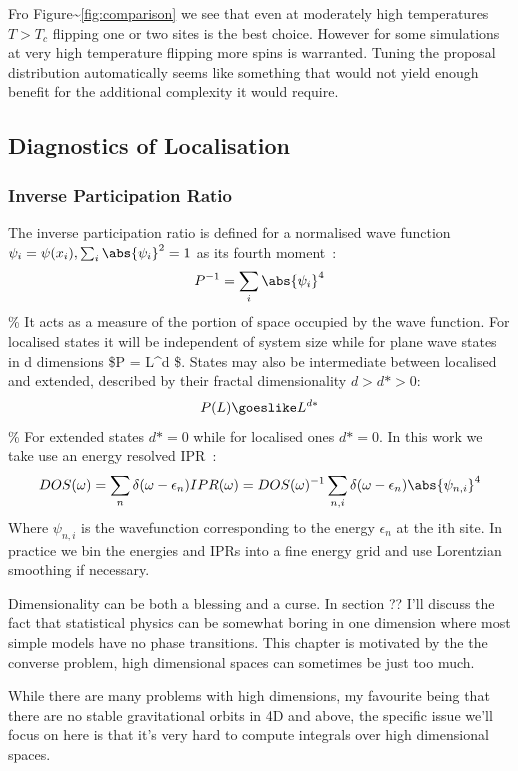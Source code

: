 Fro Figure\textasciitilde{}\ref{fig:comparison} we see that even at moderately high temperatures \(T > T_c\) flipping one or two sites is the best choice. However for some simulations at very high temperature flipping more spins is warranted. Tuning the proposal distribution automatically seems like something that would not yield enough benefit for the additional complexity it would require.

\hypertarget{diagnostics-of-localisation}{%
\subsection{Diagnostics of Localisation}\label{diagnostics-of-localisation}}

\hypertarget{inverse-participation-ratio}{%
\subsubsection{Inverse Participation Ratio}\label{inverse-participation-ratio}}

The inverse participation ratio is defined for a normalised wave function \(\psi_i = \psi(x_i), \sum_i \abs{\psi_i}^2 = 1\) as its fourth moment~\autocite{kramerLocalizationTheoryExperiment1993}: \[
P^{-1} = \sum_i \abs{\psi_i}^4
\] \% It acts as a measure of the portion of space occupied by the wave function. For localised states it will be independent of system size while for plane wave states in d dimensions \$P = L\^{}d \$. States may also be intermediate between localised and extended, described by their fractal dimensionality \(d > d* > 0\): \[
P(L) \goeslike L^{d*} 
\] \% For extended states \(d* = 0\) while for localised ones \(d* = 0\). In this work we take use an energy resolved IPR~\autocite{andersonAbsenceDiffusionCertain1958}: \[
DOS(\omega) = \sum_n \delta(\omega - \epsilon_n)
IPR(\omega) = DOS(\omega)^{-1} \sum_{n,i} \delta(\omega - \epsilon_n) \abs{\psi_{n,i}}^4
\] Where \(\psi_{n,i}\) is the wavefunction corresponding to the energy \(\epsilon_n\) at the ith site. In practice we bin the energies and IPRs into a fine energy grid and use Lorentzian smoothing if necessary.

Dimensionality can be both a blessing and a curse. In section ?? I'll discuss the fact that statistical physics can be somewhat boring in one dimension where most simple models have no phase transitions. This chapter is motivated by the the converse problem, high dimensional spaces can sometimes be just too much.

While there are many problems with high dimensions, my favourite being that there are no stable gravitational orbits in 4D and above, the specific issue we'll focus on here is that it's very hard to compute integrals over high dimensional spaces.

